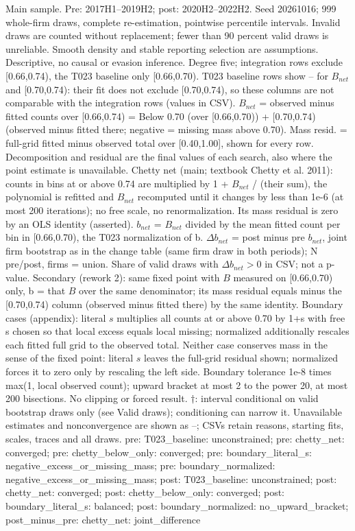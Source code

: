 \begin{threeparttable}
\begin{tablenotes}[flushleft]
\item[] Main sample. Pre: 2017H1--2019H2; post: 2020H2--2022H2. Seed 20261016; 999 whole-firm draws, complete re-estimation, pointwise percentile intervals. Invalid draws are counted without replacement; fewer than 90 percent valid draws is unreliable. Smooth density and stable reporting selection are assumptions. Descriptive, no causal or evasion inference. Degree five; integration rows exclude [0.66,0.74), the T023 baseline only [0.66,0.70). T023 baseline rows show -- for $B_{net}$ and [0.70,0.74): their fit does not exclude [0.70,0.74), so these columns are not comparable with the integration rows (values in CSV). $B_{net}$ = observed minus fitted counts over [0.66,0.74) = Below 0.70 (over [0.66,0.70)) + [0.70,0.74) (observed minus fitted there; negative = missing mass above 0.70). Mass resid. = full-grid fitted minus observed total over [0.40,1.00], shown for every row. Decomposition and residual are the final values of each search, also where the point estimate is unavailable. Chetty net (main; textbook Chetty et al. 2011): counts in bins at or above 0.74 are multiplied by 1 + $B_{net}$ / (their sum), the polynomial is refitted and $B_{net}$ recomputed until it changes by less than 1e-6 (at most 200 iterations); no free scale, no renormalization. Its mass residual is zero by an OLS identity (asserted). $b_{net}$ = $B_{net}$ divided by the mean fitted count per bin in [0.66,0.70), the T023 normalization of b. $\Delta b_{net}$ = post minus pre $b_{net}$, joint firm bootstrap as in the change table (same firm draw in both periods); N pre/post, firms = union. Share of valid draws with $\Delta b_{net} > 0$ in CSV; not a p-value. Secondary (rework 2): same fixed point with $B$ measured on [0.66,0.70) only, b = that $B$ over the same denominator; its mass residual equals minus the [0.70,0.74) column (observed minus fitted there) by the same identity. Boundary cases (appendix): literal $s$ multiplies all counts at or above 0.70 by 1+s with free s chosen so that local excess equals local missing; normalized additionally rescales each fitted full grid to the observed total. Neither case conserves mass in the sense of the fixed point: literal $s$ leaves the full-grid residual shown; normalized forces it to zero only by rescaling the left side. Boundary tolerance 1e-8 times max(1, local observed count); upward bracket at most 2 to the power 20, at most 200 bisections. No clipping or forced result. $\dagger$: interval conditional on valid bootstrap draws only (see Valid draws); conditioning can narrow it. Unavailable estimates and nonconvergence are shown as --; CSVs retain reasons, starting fits, scales, traces and all draws. pre: T023\_baseline: unconstrained; pre: chetty\_net: converged; pre: chetty\_below\_only: converged; pre: boundary\_literal\_s: negative\_excess\_or\_missing\_mass; pre: boundary\_normalized: negative\_excess\_or\_missing\_mass; post: T023\_baseline: unconstrained; post: chetty\_net: converged; post: chetty\_below\_only: converged; post: boundary\_literal\_s: balanced; post: boundary\_normalized: no\_upward\_bracket; post\_minus\_pre: chetty\_net: joint\_difference
\end{tablenotes}
\end{threeparttable}
\endgroup
\par\medskip
